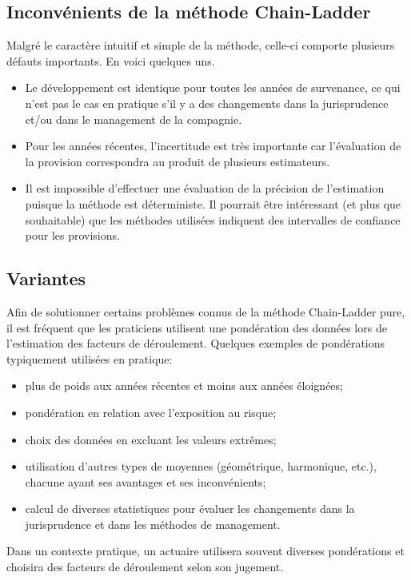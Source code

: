 \subsection{Inconvénients de la méthode Chain-Ladder}
\label{sec:deterministe:CL:inconvenients}

Malgré le caractère intuitif et simple de la méthode, celle-ci
comporte plusieurs défauts importants. En voici quelques uns.
\begin{itemize}
\item Le développement est identique pour toutes les années de
  survenance, ce qui n'est pas le cas en pratique s'il y a des
  changements dans la jurisprudence et/ou dans le management de la
  compagnie.
\item Pour les années récentes, l'incertitude est très importante car
  l'évaluation de la provision correspondra au produit de plusieurs
  estimateurs.
\item Il est impossible d'effectuer une évaluation de la précision de
  l'estimation puisque la méthode est déterministe. Il pourrait être
  intéressant (et plus que souhaitable) que les méthodes utilisées
  indiquent des intervalles de confiance pour les provisions.
\end{itemize}

\subsection{Variantes}
\label{sec:deterministe:CL:variantes}

Afin de solutionner certains problèmes connus de la méthode
Chain-Ladder pure, il est fréquent que les praticiens utilisent une
pondération des données lors de l'estimation des facteurs de
déroulement. Quelques exemples de pondérations typiquement utilisées
en pratique:
\begin{itemize}
\item plus de poids aux années récentes et moins aux années éloignées;
\item pondération en relation avec l'exposition au risque;
\item choix des données en excluant les valeurs extrêmes;
\item utilisation d'autres types de moyennes (géométrique, harmonique,
  etc.), chacune ayant ses avantages et ses inconvénients;
\item calcul de diverses statistiques pour évaluer les changements
  dans la jurisprudence et dans les méthodes de management.
\end{itemize}
Dans un contexte pratique, un actuaire utilisera souvent diverses
pondérations et choisira des facteurs de déroulement selon son
jugement.

